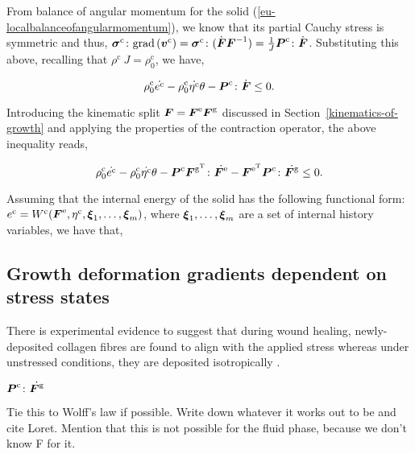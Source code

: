 \noindent From balance of angular momentum for the solid
(\ref{eu-localbalanceofangularmomentum}), we know that its partial
Cauchy stress is symmetric and thus,
$\mbox{\boldmath$\sigma$}^{\mathrm{c}}\colon\mathrm{grad}\left(\mbox{\boldmath$ v$}^{\mathrm{c}}\right)
=\mbox{\boldmath$\sigma$}^{\mathrm{c}}\colon(\dot{\mbox{\boldmath$ F$}}\mbox{\boldmath$ F$}^{-1})
=\frac{1}{J}\mbox{\boldmath$ P$}^{\mathrm{c}}\colon\dot{\mbox{\boldmath$ F$}}$. Substituting this above,
recalling that \mbox{$\rho^{\mathrm{c}}\ J=\rho_0^{\mathrm{c}}$}, we
have,

\begin{equation*}
\rho_{0}^{\mathrm{c}} \dot{e^{\mathrm{c}}}
- \rho_{0}^{\mathrm{c}} \dot{\eta^{\mathrm{c}}} \theta
-\mbox{\boldmath$ P$}^{\mathrm{c}}\colon\dot{\mbox{\boldmath$ F$}}\leq 0.
\end{equation*}

Introducing the kinematic split $\mbox{\boldmath$ F$}=\mbox{\boldmath$ F$}^{\mathrm{e}}\mbox{\boldmath$ F$}^{\mathrm{g}}$
discussed in Section~\ref{kinematics-of-growth} and applying the
properties of the contraction operator, the above inequality reads,

\begin{equation*}
\rho_{0}^{\mathrm{c}} \dot{e^{\mathrm{c}}}
- \rho_{0}^{\mathrm{c}} \dot{\eta^{\mathrm{c}}} \theta
- \mbox{\boldmath$ P$}^{\mathrm{c}} \mbox{\boldmath$ F$}^{\mathrm{g}^{\mathrm{T}}} \colon
\dot{\mbox{\boldmath$ F$}^{\mathrm{e}}}
- \mbox{\boldmath$ F$}^{\mathrm{e}^{\mathrm{T}}}  \mbox{\boldmath$ P$}^{\mathrm{c}} \colon
\dot{\mbox{\boldmath$ F$}^{\mathrm{g}}}
\leq 0.
\end{equation*}

Assuming that the internal energy of the solid has the following
functional form: $e^{\mathrm{c}}=W^{\mathrm{c}}(\mbox{\boldmath$ F$}^{\mathrm{e}},\eta^{\mathrm{c}},
\mbox{\boldmath$\xi$}_{1},\ldots,\mbox{\boldmath$\xi$}_{m})$, where $\mbox{\boldmath$\xi$}_{1},\ldots,\mbox{\boldmath$\xi$}_{m}$ are a set
of internal history variables, we have that,


\subsection{Growth deformation gradients dependent on stress states}
\label{eu-stress-dependent-source}

There is experimental evidence to suggest that during wound healing,
newly-de\-po\-sit\-ed collagen fibres are found to align with the
applied stress whereas under unstressed conditions, they are deposited
isotropically \citep{Provenzanoetal:2003}.

$\mbox{\boldmath$ P$}^{\mathrm{c}} \colon
\dot{\mbox{\boldmath$ F$}^{\mathrm{g}}}$

Tie this to Wolff's law if possible. Write down whatever it works out
to be and cite Loret. Mention that this is not possible for the fluid
phase, because we don't know F for it.

